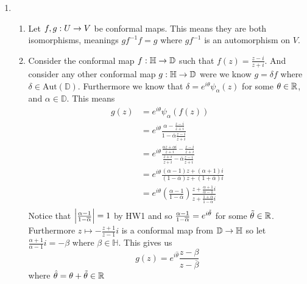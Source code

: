 \documentclass[12pt]{amsart}
\newcommand{\ps}[1]{\left( #1 \right)}
\newcommand{\HH}{\mathbb{H}}
\newcommand{\D}{\mathbb{D}}
\begin{document}
\begin{enumerate}
\item 
\begin{enumerate}
    \item Let $f,g:U\rightarrow V$ be conformal maps. This means they are both isomorphisms, meanings $gf^{-1}f=g$ where $gf^{-1}$ is an automorphism on $V$.
    \item Consider the conformal map $f:\HH\ra\D$ such that $f(z)=\frac{z-i}{z+i}$. And consider any other conformal map $g:\HH\ra\D$ were we know $g=\delta f$ where $\delta\in \text{Aut}(\D)$. Furthermore we know that $\delta=e^{i\theta}\psi_\alpha(z)$ for some $\theta\in \mathbb{R}$, and $\alpha\in \D$. This means \begin{align*}
        g(z)&=e^{i\theta}\psi_\alpha(f(z))\\
        &=e^{i\theta}\frac{\alpha-\frac{z-i}{z+i}}{1-\overline{\alpha}\frac{z-i}{z+i}}\\
        &=e^{i\theta}\frac{\frac{\alpha z+\alpha i}{z+i}-\frac{z-i}{z+i}}{\frac{z+i}{z+i}-\overline{\alpha}\frac{z-i}{z+i}}\\
        &=e^{i\theta}\frac{(\alpha-1)z+(\alpha+1)i}{(1-\overline{\alpha})z+(1+\overline{\alpha})i}\\
        &=e^{i\theta}\ps{\frac{\alpha-1}{1-\overline{\alpha}}}\frac{z+\frac{\alpha+1}{\alpha-1}i}{z+\frac{1+\overline{\alpha}}{1-\overline{\alpha}}i}\\
    \end{align*}
    Notice that $\left| \frac{\alpha-1}{1-\overline{\alpha}} \right|=1$ by HW1 and so $\frac{\alpha-1}{1-\overline{\alpha}}=e^{i\Tilde{\theta}}$ 
    for some $\Tilde{\theta}\in\mathbb{R}$. Furthermore $z\mapsto -\frac{z+1}{z-1}i$ is a conformal map from $\D\ra\HH$ so let 
    $\frac{\alpha+1}{\alpha-1}i=-\beta$ where $\beta\in \HH$. This gives us
    $$g(z)=e^{i\hat\theta}\frac{z-\beta}{z-\overline{\beta}}$$
    where $\hat\theta=\theta+\Tilde{\theta}\in \mathbb{R}$
\end{enumerate}
\end{enumerate}
\end{document}
